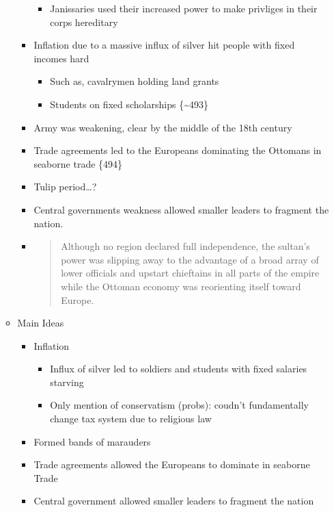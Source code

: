 \documentclass[letterpaper]{article}
\begin{document}
\begin{itemize}
\begin{itemize}
\begin{itemize}
\begin{itemize}
\item Janissaries used their increased power to make privliges in
their corps hereditary
\end{itemize}

\item Inflation due to a massive influx of silver hit people with fixed
incomes hard

\begin{itemize}
\item Such as, cavalrymen holding land grants
\item Students on fixed scholarships \{\textasciitilde{}493\}
\end{itemize}

\item Army was weakening, clear by the middle of the 18th century

\item Trade agreements led to the Europeans dominating the Ottomans in
seaborne trade \{494\}

\item Tulip period\ldots{}?

\item Central governments weakness allowed smaller leaders to fragment
the nation.

\item \begin{quote}
Although no region declared full independence, the sultan's
power was slipping away to the advantage of a broad array of
lower officials and upstart chieftains in all parts of the
empire while the Ottoman economy was reorienting itself toward
Europe.
\end{quote}
\end{itemize}

\item Main Ideas

\begin{itemize}
\item Inflation

\begin{itemize}
\item Influx of silver led to soldiers and students with fixed
salaries starving
\item Only mention of conservatism (probs): coudn't fundamentally
change tax system due to religious law
\end{itemize}

\item Formed bands of marauders
\item Trade agreements allowed the Europeans to dominate in seaborne
Trade
\item Central government allowed smaller leaders to fragment the nation
\end{itemize}
\end{itemize}
\end{itemize}
\end{document}
